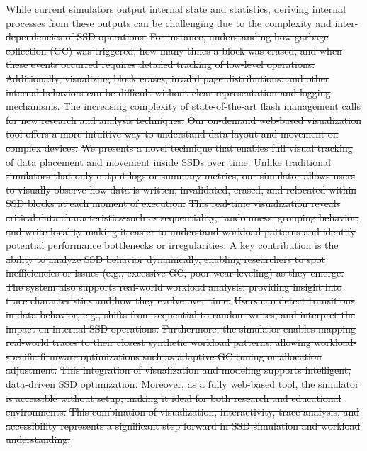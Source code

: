 \documentclass{ieeeaccess}
\begin{document}
\sout{While current simulators output internal state and statistics, deriving internal processes from these outputs can be challenging due to the complexity and inter-dependencies of SSD operations.} \sout{For instance, understanding how garbage collection (GC) was triggered, how many times a block was erased, and when these events occurred requires detailed tracking of low-level operations.} \sout{Additionally, visualizing block erases, invalid page distributions, and other internal behaviors can be difficult without clear representation and logging mechanisms.}
\sout{The increasing complexity of state-of-the-art flash management calls for new research and analysis techniques.} \sout{Our on-demand web-based visualization tool offers a more intuitive way to understand data layout and movement on complex devices.}
\sout{We presents a novel technique that enables full visual tracking of data placement and movement inside SSDs over time.} \sout{Unlike traditional simulators that only output logs or summary metrics, our simulator allows users to visually observe how data is written, invalidated, erased, and relocated within SSD blocks at each moment of execution.}
\sout{This real-time visualization reveals critical data characteristics-such as sequentiality, randomness, grouping behavior, and write locality-making it easier to understand workload patterns and identify potential performance bottlenecks or irregularities.}
\sout{A key contribution is the ability to analyze SSD behavior dynamically, enabling researchers to spot inefficiencies or issues (e.g., excessive GC, poor wear-leveling) as they emerge.} \sout{The system also supports real-world workload analysis, providing insight into trace characteristics and how they evolve over time.} \sout{Users can detect transitions in data behavior, e.g., shifts from sequential to random writes, and interpret the impact on internal SSD operations.} \sout{Furthermore, the simulator enables mapping real-world traces to their closest synthetic workload patterns, allowing workload-specific firmware optimizations such as adaptive GC tuning or allocation adjustment.} \sout{This integration of visualization and modeling supports intelligent, data-driven SSD optimization.}
\sout{Moreover, as a fully web-based tool, the simulator is accessible without setup, making it ideal for both research and educational environments.} \sout{This combination of visualization, interactivity, trace analysis, and accessibility represents a significant step forward in SSD simulation and workload understanding.}
\end{document}
